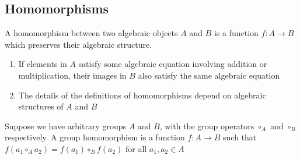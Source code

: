 \subsection{Homomorphisms}
A homomorphism between two algebraic objects $A$ and $B$ is a function $f: A \rightarrow B$ which preserves their algebraic structure. 
\begin{enumerate}
    \item If elements in $A$ satisfy some algebraic equation involving addition or multiplication, their images in $B$ also satisfy the same algebraic equation
    \item The details of the definitions of homomorphisms depend on algebraic structures of $A$ and $B$
\end{enumerate}

\begin{definition}
Suppose we have arbitrary groups $A$ and $B$, with the group operators $\circ_A$ and $\circ_B$ respectively. A group homomorphism is a function $f: A \rightarrow B$ such that $f(a_1 \circ_A a_2) = f(a_1) \circ_B f(a_2)$ for all $a_1,a_2 \in A$
\end{definition}
